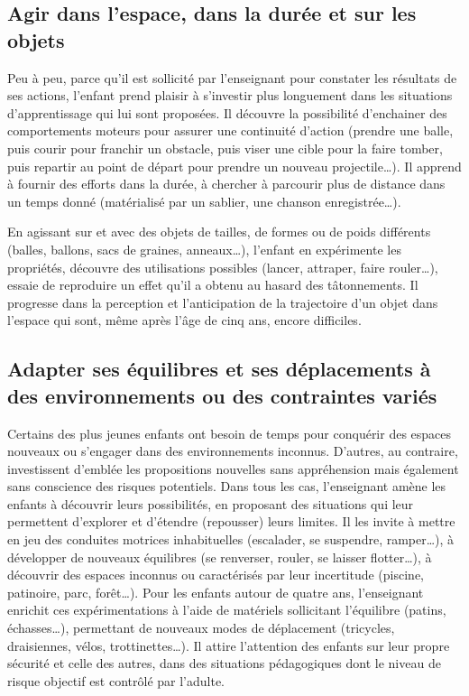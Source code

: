 \subsection{Agir dans l’espace, dans la durée et sur les objets}
Peu à peu, parce qu’il est sollicité par l’enseignant pour constater les résultats de ses actions, l’enfant prend plaisir à s’investir plus longuement dans les situations d’apprentissage qui lui sont proposées. Il découvre la possibilité d’enchainer des comportements moteurs pour assurer une continuité d’action (prendre une balle, puis courir pour franchir un obstacle, puis viser une cible pour la faire tomber, puis repartir au point de départ pour prendre un nouveau projectile\dots). Il apprend à fournir des efforts dans la durée, à chercher à parcourir plus de distance dans un temps donné (\og matérialisé \fg{} par un sablier, une chanson enregistrée\dots).

En agissant sur et avec des objets de tailles, de formes ou de poids différents (balles, ballons, sacs de graines, anneaux\dots), l’enfant en expérimente les propriétés, découvre des utilisations possibles (lancer, attraper, faire rouler\dots), essaie de reproduire un effet qu’il a obtenu au hasard des tâtonnements. Il progresse dans la perception et l’anticipation de la trajectoire d’un objet dans l’espace qui sont, même après l’âge de cinq ans, encore difficiles. 

\subsection{Adapter ses équilibres et ses déplacements à des environnements ou des contraintes variés}
Certains des plus jeunes enfants ont besoin de temps pour conquérir des espaces nouveaux ou s’engager dans des environnements inconnus. D’autres, au contraire, investissent d’emblée les propositions nouvelles sans appréhension mais également sans conscience des risques potentiels. Dans tous les cas, l’enseignant amène les enfants à découvrir leurs possibilités, en proposant des situations qui leur permettent d’explorer et d’étendre (repousser) leurs limites. Il les invite à mettre en jeu des conduites motrices inhabituelles (escalader, se suspendre, ramper\dots), à développer de nouveaux équilibres (se renverser, rouler, se laisser flotter\dots), à découvrir des espaces inconnus ou caractérisés par leur incertitude (piscine, patinoire, parc, forêt\dots). Pour les enfants autour de quatre ans, l’enseignant enrichit ces expérimentations à l’aide de matériels sollicitant l’équilibre (patins, échasses\dots), permettant de nouveaux modes de déplacement (tricycles, draisiennes, vélos, trottinettes\dots). Il attire l’attention des enfants sur leur propre sécurité et celle des autres, dans des situations pédagogiques dont le niveau de risque objectif est contrôlé par l'adulte. 

